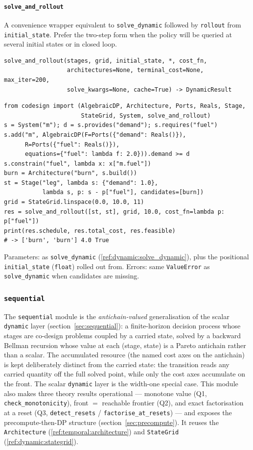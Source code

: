 \documentclass[11pt,a4paper]{article}
\begin{document}
\paragraph{\texttt{solve\_and\_rollout}}\label{ref:dynamic:solve_and_rollout}
A convenience wrapper equivalent to \texttt{solve\_dynamic} followed by
\texttt{rollout} from \texttt{initial\_state}. Prefer the two-step form when
the policy will be queried at several initial states or in closed loop.
\begin{lstlisting}
solve_and_rollout(stages, grid, initial_state, *, cost_fn,
                  architectures=None, terminal_cost=None, max_iter=200,
                  solve_kwargs=None, cache=True) -> DynamicResult
\end{lstlisting}
\begin{lstlisting}
from codesign import (AlgebraicDP, Architecture, Ports, Reals, Stage,
                      StateGrid, System, solve_and_rollout)
s = System("m"); d = s.provides("demand"); s.requires("fuel")
s.add("m", AlgebraicDP(F=Ports({"demand": Reals()}),
      R=Ports({"fuel": Reals()}),
      equations={"fuel": lambda f: 2.0})).demand >= d
s.constrain("fuel", lambda x: x["m.fuel"])
burn = Architecture("burn", s.build())
st = Stage("leg", lambda s: {"demand": 1.0},
           lambda s, p: s - p["fuel"], candidates=[burn])
grid = StateGrid.linspace(0.0, 10.0, 11)
res = solve_and_rollout([st, st], grid, 10.0, cost_fn=lambda p: p["fuel"])
print(res.schedule, res.total_cost, res.feasible)
# -> ['burn', 'burn'] 4.0 True
\end{lstlisting}
Parameters: as \texttt{solve\_dynamic} (\ref{ref:dynamic:solve_dynamic}),
plus the positional \texttt{initial\_state} (\texttt{float}) rolled out
from.
Errors: same \texttt{ValueError} as \texttt{solve\_dynamic} when candidates
are missing.

\subsubsection{\texttt{sequential}}\label{ref:sequential}

The \texttt{sequential} module is the \emph{antichain-valued} generalisation
of the scalar \texttt{dynamic} layer (section~\ref{sec:sequential}): a
finite-horizon decision process whose stages are co-design problems coupled
by a carried state, solved by a backward Bellman recursion whose value at
each (stage, state) is a Pareto antichain rather than a scalar. The
accumulated resource (the named cost axes on the antichain) is kept
deliberately distinct from the carried state: the transition reads any
carried quantity off the full solved point, while only the cost axes
accumulate on the front. The scalar \texttt{dynamic} layer is the width-one
special case. This module also makes three theory results operational ---
monotone value (Q1, \texttt{check\_monotonicity}), front $=$ reachable
frontier (Q2), and exact factorisation at a reset (Q3,
\texttt{detect\_resets} / \texttt{factorise\_at\_resets}) --- and exposes
the precompute-then-DP structure (section~\ref{sec:precompute}). It reuses
the \texttt{Architecture} (\ref{ref:temporal:architecture}) and
\texttt{StateGrid} (\ref{ref:dynamic:stategrid}).
\end{document}
